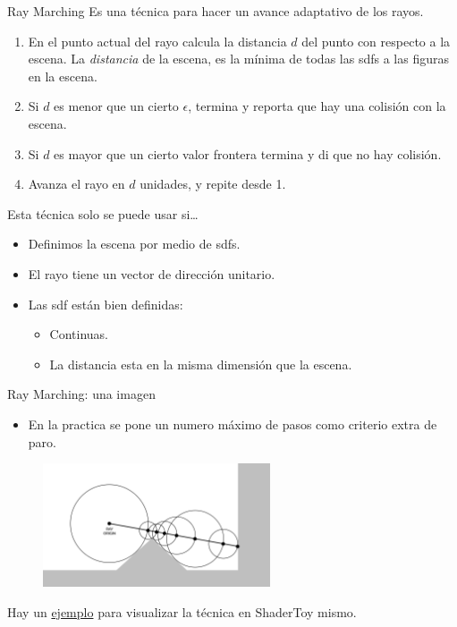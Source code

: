 \begin{frame}{Ray Marching}
Es una técnica para hacer un avance adaptativo de los rayos.
\begin{enumerate}
    \item En el punto actual del rayo calcula la distancia $d$ del punto con respecto a la escena.
    La \emph{distancia} de la escena, es la mínima de todas las sdfs a las figuras en la escena.
    \item Si $d$ es menor que un cierto $\epsilon$, termina y reporta que hay una colisión con la escena.
    \item Si $d$ es mayor que un cierto valor frontera termina y di que no hay colisión.
    \item Avanza el rayo en $d$ unidades, y repite desde 1.
\end{enumerate}
Esta técnica solo se puede usar si\ldots
\begin{itemize}
    \item Definimos la escena por medio de sdfs.
    \item El rayo tiene un vector de dirección unitario.
    \item Las sdf están bien definidas:
    \begin{itemize}
        \item Continuas.
        \item La distancia esta en la misma dimensión que la escena.
    \end{itemize}    
\end{itemize}

\end{frame}

\begin{frame}{Ray Marching: una imagen}

\begin{itemize}
    \item En la practica se pone un numero máximo de pasos como criterio extra de paro.
\end{itemize}    

\begin{figure}[htp]
    \centering
    \includegraphics[width=0.6\textwidth]{img/rayMarch}    
\end{figure}

Hay un \href{https://www.shadertoy.com/view/4dSfRc}{ejemplo} para visualizar la técnica en ShaderToy mismo.

\end{frame}

